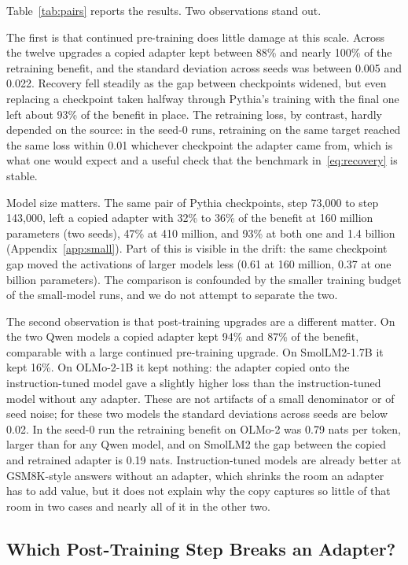 \documentclass[ijds,nonblindrev]{informs4}
\begin{document}
Table~\ref{tab:pairs} reports the results. Two observations stand out.

The first is that continued pre-training does little damage at this scale. Across the twelve upgrades a copied adapter kept between 88\% and nearly 100\% of the retraining benefit, and the standard deviation across seeds was between 0.005 and 0.022. Recovery fell steadily as the gap between checkpoints widened, but even replacing a checkpoint taken halfway through Pythia's training with the final one left about 93\% of the benefit in place. The retraining loss, by contrast, hardly depended on the source: in the seed-0 runs, retraining on the same target reached the same loss within 0.01 whichever checkpoint the adapter came from, which is what one would expect and a useful check that the benchmark in~\eqref{eq:recovery} is stable.

Model size matters. The same pair of Pythia checkpoints, step 73{,}000 to step 143{,}000, left a copied adapter with 32\% to 36\% of the benefit at 160 million parameters (two seeds), 47\% at 410 million, and 93\% at both one and 1.4 billion (Appendix~\ref{app:small}). Part of this is visible in the drift: the same checkpoint gap moved the activations of larger models less (0.61 at 160 million, 0.37 at one billion parameters). The comparison is confounded by the smaller training budget of the small-model runs, and we do not attempt to separate the two.

The second observation is that post-training upgrades are a different matter. On the two Qwen models a copied adapter kept 94\% and 87\% of the benefit, comparable with a large continued pre-training upgrade. On SmolLM2-1.7B it kept 16\%. On OLMo-2-1B it kept nothing: the adapter copied onto the instruction-tuned model gave a slightly higher loss than the instruction-tuned model without any adapter. These are not artifacts of a small denominator or of seed noise; for these two models the standard deviations across seeds are below 0.02. In the seed-0 run the retraining benefit on OLMo-2 was 0.79 nats per token, larger than for any Qwen model, and on SmolLM2 the gap between the copied and retrained adapter is 0.19 nats. Instruction-tuned models are already better at GSM8K-style answers without an adapter, which shrinks the room an adapter has to add value, but it does not explain why the copy captures so little of that room in two cases and nearly all of it in the other two.

\subsection{Which Post-Training Step Breaks an Adapter?}\label{sec:stages}
\end{document}
